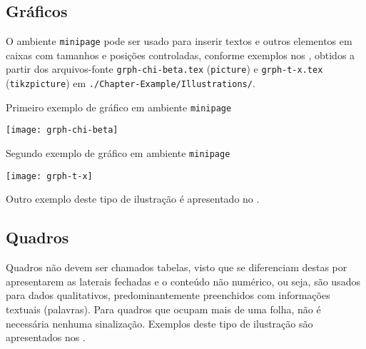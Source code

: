 \subsection{Gráficos}%
\label{ssect:grph}

O ambiente \texttt{minipage} pode ser usado para inserir textos e outros elementos em caixas com tamanhos e posições controladas, conforme exemplos nos , obtidos a partir dos arquivos-fonte \texttt{grph-chi-beta.tex} (\texttt{picture}) e \texttt{grph-t-x.tex} (\texttt{tikzpicture}) em \texttt{./Chapter-Example/Illustrations/}.

\begin{graph}[!htbp]
\begin{minipage}[t]{7cm}
\centering%
\SetCaptionWidth{\linewidth}
\caption{Primeiro exemplo de gráfico em ambiente \texttt{minipage}}%
\label{grph:chi-beta}
\texttt{[image: grph-chi-beta]}
\end{minipage}
\hfill
\begin{minipage}[t]{8cm}
\centering%
\SetCaptionWidth{\linewidth}
\caption{Segundo exemplo de gráfico em ambiente \texttt{minipage}}%
\label{grph:t-x}
\texttt{[image: grph-t-x]}
\end{minipage}
\end{graph}

Outro exemplo deste tipo de ilustração é apresentado no .

\subsection{Quadros}%
\label{ssect:tfrm}

Quadros não devem ser chamados tabelas, visto que se diferenciam destas por apresentarem as laterais fechadas e o conteúdo não numérico, ou seja, são usados para dados qualitativos, predominantemente preenchidos com informações textuais (palavras).
Para quadros que ocupam mais de uma folha, não é necessária nenhuma sinalização.
Exemplos deste tipo de ilustração são apresentados nos .
